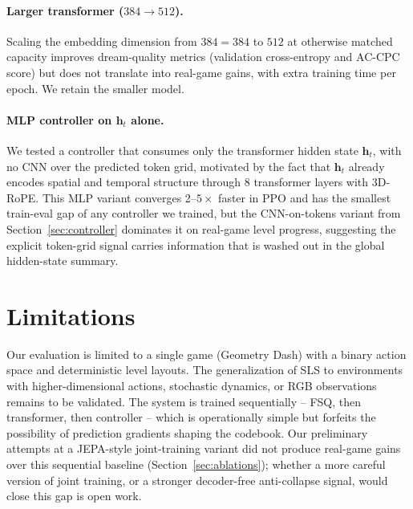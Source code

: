 \documentclass{article}
\newcommand{\hdim}{384}
\newcommand{\nlayers}{8}
\begin{document}
\paragraph{Larger transformer ($\hdim \to 512$).}
Scaling the embedding dimension from $\hdim = 384$ to $512$ at otherwise matched capacity improves dream-quality metrics (validation cross-entropy and AC-CPC score) but does not translate into real-game gains, with extra training time per epoch. We retain the smaller model.

\paragraph{MLP controller on $\mathbf{h}_t$ alone.}
We tested a controller that consumes only the transformer hidden state $\mathbf{h}_t$, with no CNN over the predicted token grid, motivated by the fact that $\mathbf{h}_t$ already encodes spatial and temporal structure through $\nlayers$ transformer layers with 3D-RoPE.
This MLP variant converges 2--$5\times$ faster in PPO and has the smallest train-eval gap of any controller we trained, but the CNN-on-tokens variant from Section~\ref{sec:controller} dominates it on real-game level progress, suggesting the explicit token-grid signal carries information that is washed out in the global hidden-state summary.

\section{Limitations}
\label{sec:limitations}

Our evaluation is limited to a single game (Geometry Dash) with a binary action space and deterministic level layouts.
The generalization of SLS to environments with higher-dimensional actions, stochastic dynamics, or RGB observations remains to be validated.
The system is trained sequentially -- FSQ, then transformer, then controller -- which is operationally simple but forfeits the possibility of prediction gradients shaping the codebook. Our preliminary attempts at a JEPA-style joint-training variant did not produce real-game gains over this sequential baseline (Section~\ref{sec:ablations}); whether a more careful version of joint training, or a stronger decoder-free anti-collapse signal, would close this gap is open work.

\end{document}
